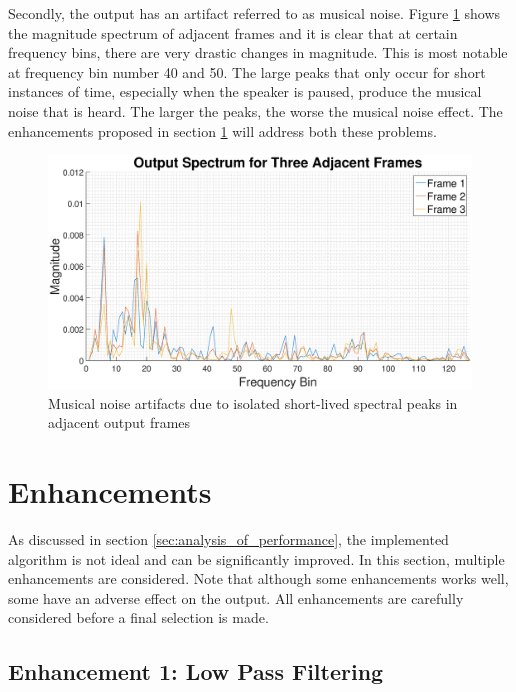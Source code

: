 \documentclass[a4paper,pra,twocolumn,10pt,aps,longbibliography,nobalancelastpage]{revtex4-1}
\begin{document}
Secondly, the output has an artifact referred to as musical noise. Figure \ref{fig:musical_noise_graph} shows the magnitude spectrum of adjacent frames and it is clear that at certain frequency bins, there are very drastic changes in magnitude. This is most notable at frequency bin number 40 and 50. The large peaks that only occur for short instances of time, especially when the speaker is paused, produce the musical noise that is heard. The larger the peaks, the worse the musical noise effect. The enhancements proposed in section \ref{sec:enhancements} will address both these problems. 

\begin{figure}[H]
	\centering
	\includegraphics[width=\columnwidth]{Y_3_adjacent}
  	\caption{Musical noise artifacts due to isolated short-lived spectral peaks in adjacent output frames}
	\label{fig:musical_noise_graph}
\end{figure}

\section{Enhancements}\label{sec:enhancements}

As discussed in section \ref{sec:analysis_of_performance}, the implemented algorithm is not ideal and can be significantly improved. In this section, multiple enhancements are considered. Note that although some enhancements works well, some have an adverse effect on the output. All enhancements are carefully considered before a final selection is made. 

\subsection{Enhancement 1: Low Pass Filtering}\label{sec:enhance_1}
\end{document}
